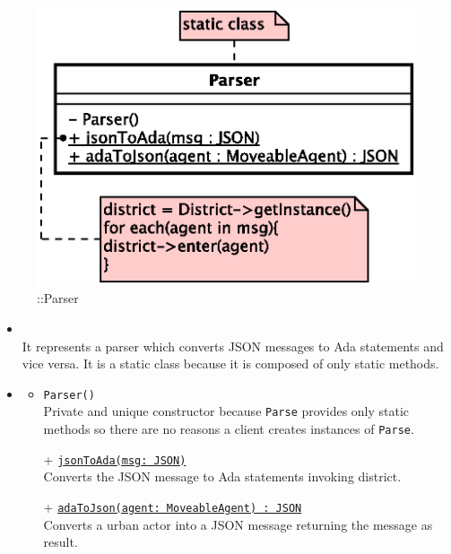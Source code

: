 \begin{figure}[h]
\centering
\includegraphics[scale=0.6,keepaspectratio]{images/solution/app/backend/parser.eps}
\caption{\pInterface::Parser}
\label{fig:sd-app-parser}
\end{figure}
\FloatBarrier
\begin{itemize}
  \item \textbf{\descr} \\
    It represents a parser which converts JSON messages to Ada statements and vice versa.
    It is a static class because it is composed of only static methods.
  \item \textbf{\ops}
  \begin{itemize}
   \item \texttt{Parser()} \\
   Private and unique constructor because \texttt{Parse} provides only static methods 
   so there are no reasons a client creates instances of \texttt{Parse}.
    \item[+] \texttt{\underline{jsonToAda(msg: JSON)}} \\
    Converts the JSON message to Ada statements invoking district.
    \item[+] \texttt{\underline{adaToJson(agent: MoveableAgent) : JSON}} \\
    Converts a urban actor into a JSON message returning the message as result.
  \end{itemize}
\end{itemize}
